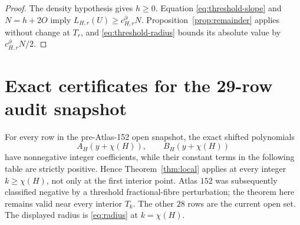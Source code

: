 \documentclass[11pt]{article}
\begin{document}
\begin{proof}
The density hypothesis gives $h\geq0$.  Equation
\eqref{eq:threshold-slope} and $N=h+2O$ imply
$L_{H,r}(U)\geq c^{\partial}_{H,r}N$.  Proposition~\ref{prop:remainder}
applies without change at $T_r$, and
\eqref{eq:threshold-radius} bounds its absolute value by
$c^{\partial}_{H,r}N/2$.
\end{proof}

\section{Exact certificates for the 29-row audit snapshot}

For every row in the pre-Atlas-152 open snapshot, the exact shifted polynomials
\[
 A_H(y+\chi(H)),\qquad B_H(y+\chi(H))
\]
have nonnegative integer coefficients, while their constant terms in the
following table are strictly positive.  Hence Theorem~\ref{thm:local}
applies at every integer $k\geq\chi(H)$, not only at the first interior
point.  Atlas $152$ was subsequently classified negative by a threshold
fractional-fibre perturbation; the theorem here remains valid near every
interior $T_k$.  The other $28$ rows are the current open set.  The displayed
radius is \eqref{eq:radius} at $k=\chi(H)$.
\end{document}
